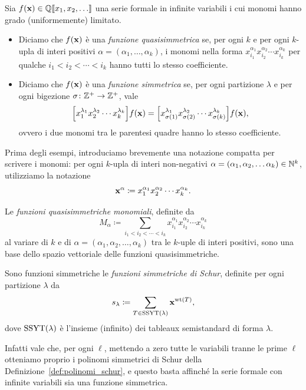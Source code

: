 \begin{definition}
    Sia $f(\mathbf{x}) \in \mathbb{Q} \llbracket x_1, x_2 , \dots \rrbracket $ una serie
    formale in infinite variabili i cui monomi hanno grado (uniformemente) limitato.

    \begin{itemize}
        \item Diciamo che $f(\mathbf{x})$ \`e una \emph{funzione quasisimmetrica} se, per ogni 
            $k$ e per ogni $k$-upla di interi positivi
            $\alpha = (\alpha_1, \dots, \alpha_k)$, i monomi nella forma
            $x_{i_1}^{\alpha_1} x_{i_2}^{\alpha_2} \cdots x_{i_k}^{\alpha_k}$
            per qualche $i_1 < i_2 < \cdots < i_k$
            hanno tutti lo stesso coefficiente.
        \item Diciamo che $f(\mathbf{x})$ \`e una \emph{funzione simmetrica} se, per ogni
            partizione $\lambda$ e per ogni bigezione $\sigma \colon \mathbb{Z}^{+}\to \mathbb{Z}^+$,
            vale
            \[
                \Bigl[x_1^{\lambda_1} x_2^{\lambda_2} 
                \cdots x_k^{\lambda_k}\Bigr]    
                f(\mathbf{x}) =
                \Bigl[x_{\sigma(1)}^{\lambda_1} x_{\sigma(2)}^{\lambda_2}
                \cdots x_{\sigma(k)}^{\lambda_k}\Bigr]
                f(\mathbf{x}),
            \]
            ovvero i due monomi tra le parentesi quadre hanno lo stesso coefficiente.
    \end{itemize}
\end{definition}


Prima degli esempi, introduciamo brevemente una notazione compatta per scrivere i monomi:
per ogni $k$-upla di interi non-negativi
$\alpha = (\alpha_1, \alpha_2, \dots \alpha_k) \in \mathbb{N}^k$,
utilizziamo la notazione
\[
    \mathbf{x}^\alpha \coloneq x_1^{\alpha_1} x_2^{\alpha_2} \cdots x_k^{\alpha_k}.
\]

\begin{example}
    Le \emph{funzioni quasisimmetriche monomiali}, definite da
    \[
        M_\alpha \coloneq \sum_{i_1 < i_2 < \cdots < i_k}
        x_{i_1}^{\alpha_1} x_{i_2}^{\alpha_2} \cdots  x_{i_k}^{\alpha_k}
    \]
    al variare di $k$ e di $\alpha = (\alpha_1, \alpha_2, \dots , \alpha_k)$ tra le
    $k$-uple di interi positivi,
    sono una base dello spazio vettoriale delle funzioni quasisimmetriche.
\end{example}

\begin{example}
    \label{ex:schur_simmetriche}
    Sono funzioni simmetriche le \emph{funzioni simmetriche di Schur}, definite
    per ogni partizione $\lambda$ da
    \[
        s_\lambda \coloneq \sum_{T \in \operatorname{SSYT}(\lambda)} \mathbf{x}^{\operatorname{wt}(T)},
    \]
    dove $\operatorname{SSYT}(\lambda)$ \`e l'insieme (infinito) dei tableaux semistandard 
    di forma $\lambda$.

    Infatti vale che, per ogni $\ell$, mettendo a zero tutte le variabili
    tranne le prime $\ell$ otteniamo proprio i polinomi simmetrici di Schur
    della Definizione~\ref{def:polinomi_schur}, e questo basta
    affinch\'e la serie formale con infinite variabili sia una funzione simmetrica.
\end{example}

